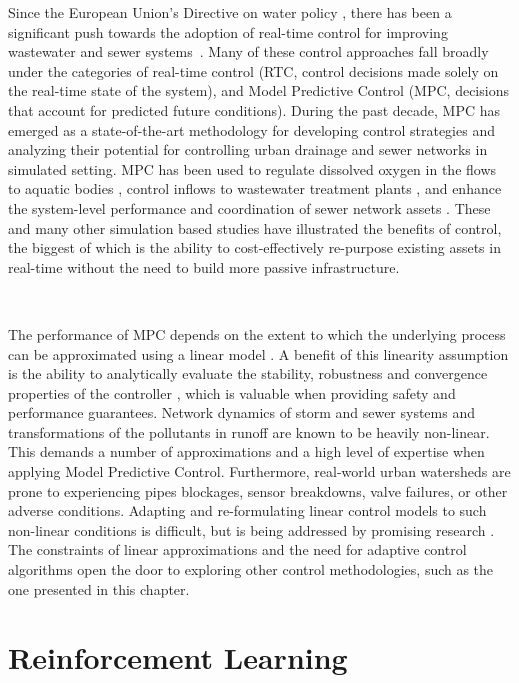 Since the European Union’s Directive on water policy \cite{TheEuropeanParliamentandthecouncilofEuropeanUnion2000DirectivePolicy}, there has been a significant push towards the adoption of real-time control for improving wastewater and sewer systems~\cite{Schutze2004RealToday,Mollerup2016}.
Many of these control approaches fall broadly under the categories of real-time control (RTC, control decisions made solely on the real-time state of the system), and Model Predictive Control (MPC, decisions that account for predicted future conditions).
During the past decade, MPC has emerged as a state-of-the-art methodology for developing control strategies and analyzing their potential for controlling urban drainage and sewer networks in simulated setting.
MPC has been used to regulate dissolved oxygen in the flows to aquatic bodies \cite{Mahmoodian2017Pollution-basedPropagation}, control inflows to wastewater treatment plants \cite{pleau2005global}, and enhance the system-level performance and coordination of sewer network assets \cite{Mollerup2016,Meneses_2018}.
These and many other simulation based studies \cite{wong2018real} have illustrated the benefits of control, the biggest of which is the ability to cost-effectively re-purpose existing assets in real-time without the need to build more passive infrastructure.

\

The performance of MPC depends on the extent to which the underlying process can be approximated using a linear model \cite{van2006model}.
A benefit of this linearity assumption is the ability to analytically evaluate the stability, robustness and convergence properties of the controller \cite{Ogata201}, which is valuable when providing safety and performance guarantees.
Network dynamics of storm and sewer systems and transformations of the pollutants in runoff are known to be heavily non-linear.
This demands a number of approximations and a high level of expertise when applying Model Predictive Control.
Furthermore, real-world urban watersheds are prone to experiencing pipes blockages, sensor breakdowns, valve failures, or other adverse conditions.
Adapting and re-formulating linear control models to such non-linear conditions is difficult, but is being addressed by promising research \cite{wong2018real}.
The constraints of linear approximations and the need for adaptive control algorithms open the door to exploring other control methodologies, such as the one presented in this chapter.

\section{Reinforcement Learning}

